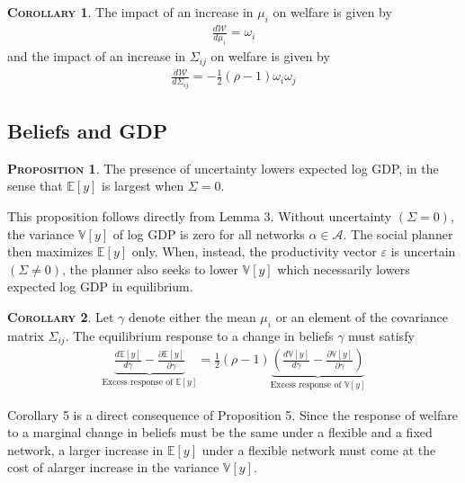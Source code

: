 \documentclass[11pt]{article}
\theoremstyle{definition}
\newtheorem{prop}{\noindent \textbf{\textsc{Proposition}}}
\newtheorem{cor}{\noindent \textbf{\textsc{Corollary}}}
\begin{document}
	\begin{cor}
		The impact of an increase in $\mu_i$ on welfare is given by
		\begin{align}
			\frac{d\mathcal{W}}{d\mu_i} = \omega_i \label{eq-39}
		\end{align}
		and the impact of an increase in $\Sigma_{ij}$ on welfare is given by
		\begin{align}
			\frac{d\mathcal{W}}{d\Sigma_{ij}} = -\frac{1}{2}(\rho-1)\omega_i\omega_j
		\end{align}
	\end{cor}
	
	\subsection{Beliefs and GDP}
	\begin{prop}
		The presence of uncertainty lowers expected log GDP, in the sense that $\mathbb{E}[y]$ is largest when $\Sigma = 0$.
	\end{prop}
	
	This proposition follows directly from Lemma 3. Without uncertainty $(\Sigma = 0)$, the variance $\mathbb{V} [y]$ of log GDP is zero for all networks $\alpha\in\mathcal{A}$. The social planner then maximizes $\mathbb{E}[y]$ only. When, instead, the productivity vector $\varepsilon$ is uncertain $(\Sigma \neq 0)$, the planner also seeks to lower $\mathbb{V} [y]$ which necessarily lowers expected log GDP in equilibrium.
	
	
	\begin{cor}
		Let $\gamma$ denote either the mean $\mu_i$ or an element of the covariance matrix $\Sigma_{ij}$. The equilibrium response to a change in beliefs $\gamma$ must satisfy
		\begin{align}
			\underbrace{\frac{d\mathbb{E}[y]}{d\gamma} - \frac{\partial\mathbb{E}[y]}{\partial \gamma}}\limits_{\text{Excess response of }\mathbb{E}[y]} = \frac{1}{2}(\rho - 1)\underbrace{\left(\frac{d\mathbb{V}[y]}{d\gamma} - \frac{\partial \mathbb{V}[y]}{\partial\gamma}\right)}\limits_{\text{Excess response of }\mathbb{V}[y]} \label{eq-41}
		\end{align}
	\end{cor}
	
	Corollary 5 is a direct consequence of Proposition 5. Since the response of welfare to a marginal change in beliefs must be the same under a flexible and a fixed network, a larger increase in $\mathbb{E}[y]$ under a flexible network must come at the cost of alarger increase in the variance $\mathbb{V}[y]$. 
	
\end{document}
